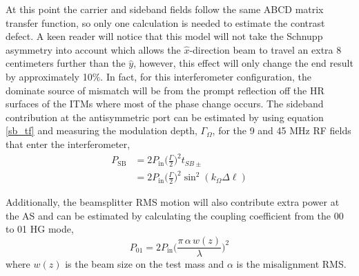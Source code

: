 	At this point the carrier and sideband fields follow the same ABCD matrix transfer function, so only one calculation is needed to estimate the contrast defect.  A keen reader will notice that this model will not take the Schnupp asymmetry into account which allows the $\hat{x}$-direction beam to travel an extra 8 centimeters further than the $\hat{y}$, however, this effect will only change the end result by approximately 10$\%$.  In fact, for this interferometer configuration, the dominate source of mismatch will be from the prompt reflection off the HR surfaces of the ITMs where most of the phase change occurs.  The sideband contribution at the antisymmetric port can be estimated by using equation \ref{sb_tf} and measuring the modulation depth, $\Gamma_{\Omega}$, for the 9 and 45 MHz RF fields that enter the interferometer,
	\begin{equation}
	\begin{aligned}
	P_{\text{SB}}	&= 2 P_{\text{in}} \bigg( \frac{\Gamma}{2} \bigg)^2 t_{SB\pm} \\
					&= 2 P_{\text{in}} \bigg( \frac{\Gamma}{2} \bigg)^2 \sin^2(k_{\Omega} \Delta \ell)
	\end{aligned}
	\end{equation}

	Additionally, the beamsplitter RMS motion will also contribute extra power at the AS and can be estimated by calculating the coupling coefficient from the 00 to 01 HG mode,
	\begin{equation}
	P_{01} = 2 P_{\text{in}} \bigg( \frac{\pi \, \alpha \, w(z)}{\lambda}\bigg)^2
	\end{equation}
	where $w(z)$ is the beam size on the test mass and $\alpha$ is the misalignment RMS.
	
